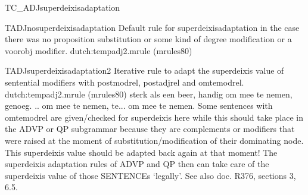 \begin{mruleclass}{TC\_ADJsuperdeixisadaptation}
\begin{members}
\begin{member}
\end{member}
\begin{member}
 TADJnosuperdeixisadaptation
 Default rule for superdeixisadaptation in the case there was no 
proposition substitution or some kind of degree modification or a voorobj 
modifier.
\file dutch:tempadj2.mrule (mrules80)
\semantics \nosemantics
\example
\remarks\mbox{}

\end{member}
\begin{member}
 TADJsuperdeixisadaptation2
 Iterative rule to adapt the superdeixis value of sentential 
modifiers with postmodrel, postadjrel and omtemodrel.
\file dutch:tempadj2.mrule (mrules80)
\semantics \nosemantics
\example sterk als een beer, handig om mee te nemen, genoeg.
.. om mee te nemen, te... om mee te nemen.
\remarks\mbox{}
Some sentences with omtemodrel are given/checked for 
superdeixis here while this should take place in the ADVP or QP subgrammar 
because they are complements or modifiers that were raised at the moment of 
substitution/modification of their dominating node. This superdeixis value 
should be adapted back again at that moment! The superdeixis adaptation rules 
of ADVP and QP then can take care of the superdeixis value of those SENTENCEs
`legally'. See also doc. R376, sections 3, 6.5.
\end{member}

\end{members}

\end{mruleclass}

